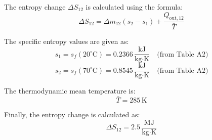 The entropy change \( \Delta S_{12} \) is calculated using the formula:  
\[
\Delta S_{12} = \Delta m_{12} (s_2 - s_1) + \frac{Q_{\text{out},12}}{\bar{T}}
\]  

The specific entropy values are given as:  
\[
s_1 = s_f(20^\circ\text{C}) = 0.2366 \, \frac{\text{kJ}}{\text{kg·K}} \quad \text{(from Table A2)}
\]  
\[
s_2 = s_f(70^\circ\text{C}) = 0.8545 \, \frac{\text{kJ}}{\text{kg·K}} \quad \text{(from Table A2)}
\]  

The thermodynamic mean temperature is:  
\[
\bar{T} = 285 \, \text{K}
\]  

Finally, the entropy change is calculated as:  
\[
\Delta S_{12} = 2.5 \, \frac{\text{MJ}}{\text{kg·K}}
\]